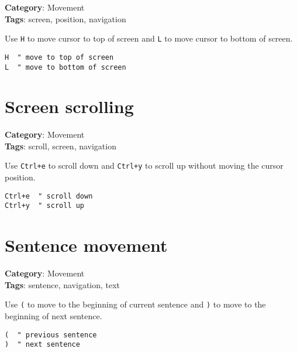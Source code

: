 {{{{{{{\textbf{Category}: Movement\\ \textbf{Tags}: screen, position, navigation
\vspace{0.5cm}

Use {\footnotesize \Verb§H§} to move cursor to top of screen and {\footnotesize \Verb§L§} to move cursor to bottom of screen.

\begin{Exa*}{}
\begin{Verbatim}[fontsize=\footnotesize, breaklines, breakanywhere]
H  " move to top of screen
L  " move to bottom of screen
\end{Verbatim}
\end{Exa*}

\section{Screen scrolling}

\textbf{Category}: Movement\\ \textbf{Tags}: scroll, screen, navigation
\vspace{0.5cm}

Use {\footnotesize \Verb§Ctrl+e§} to scroll down and {\footnotesize \Verb§Ctrl+y§} to scroll up without moving the cursor position.

\begin{Exa*}{}
\begin{Verbatim}[fontsize=\footnotesize, breaklines, breakanywhere]
Ctrl+e  " scroll down
Ctrl+y  " scroll up
\end{Verbatim}
\end{Exa*}

\section{Sentence movement}

\textbf{Category}: Movement\\ \textbf{Tags}: sentence, navigation, text
\vspace{0.5cm}

Use {\footnotesize \Verb§(§} to move to the beginning of current sentence and {\footnotesize \Verb§)§} to move to the beginning of next sentence.

\begin{Exa*}{}
\begin{Verbatim}[fontsize=\footnotesize, breaklines, breakanywhere]
(  " previous sentence
)  " next sentence
\end{Verbatim}
\end{Exa*}

}}}}}}}
